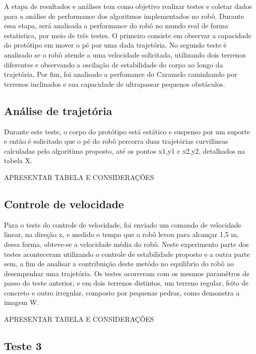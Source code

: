 \documentclass[../main.tex]{subfiles}
\begin{document}
  A etapa de resultados e análises tem como objetivo realizar testes e coletar dados para a análise de performance dos algoritmos implementados no robô. Durante essa etapa, será analisada a performance do robô no mundo real de forma estatistica, por meio de três testes. O primeiro consiste em observar a capacidade do protótipo em mover o pé por uma dada trajetória. No segundo teste é analisado se o robô atende a uma velocidade solicitada, utilizando dois terrenos diferentes e observando a oscilação de estabilidade do corpo ao longo da trajetória. Por fim, foi analisado a perfomance do Caramelo caminhando por terrenos inclinados e sua capacidade de ultrapassar pequenos obstáculos.

  \subsection{Análise de trajetória}
  Durante este teste, o corpo do protótipo está estático e suspenso por um suporte e então é solicitado que o pé do robô percorra duas trajetórias curvilíneas calculadas pelo algoritimo proposto, até os pontos x1,y1 e x2,y2, detalhados na tabela X.

  APRESENTAR TABELA E CONSIDERAÇÕES

  \subsection{Controle de velocidade}

  Para o teste do controle de velocidade, foi enviado um comando de velocidade linear, na direção x, e medido o tempo que o robô levou para alcançar 1,5 m, dessa forma, obteve-se a velocidade média do robô. Neste experimento parte dos testes aconteceram utilizando o controle de estabilidade proposto e a outra parte sem, a fim de analisar a contribuição deste metódo no equilibrio do robô ao desempenhar uma trajetória. Os testes ocorreram com os mesmos paramêtros de passo do teste anterior, e em dois terrenos distintos, um terreno regular, feito de concreto e outro irregular, composto por pequenas pedras, como demonstra a imagem W.

  APRESENTAR TABELA E CONSIDERAÇÕES
  
  \subsection{Teste 3}

    
\end{document}
